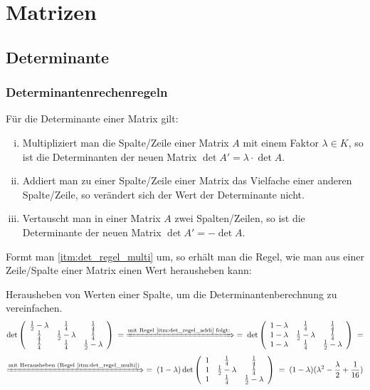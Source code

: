 \section{Matrizen}
\subsection{Determinante}
\subsubsection{Determinantenrechenregeln}\label{sec:det_regeln}
\begin{satz}Für die Determinante einer Matrix gilt:
\begin{enumerate}[i)]
    \item \label{itm:det_regel_multi} Multipliziert man die Spalte/Zeile einer Matrix $A$ mit einem Faktor $\lambda\in K$, so ist die Determinanten der neuen Matrix $\det A'=\lambda\cdot \det A$.
    \item \label{itm:det_regel_addi}Addiert man zu einer Spalte/Zeile einer Matrix das Vielfache einer anderen Spalte/Zeile, so verändert sich der Wert der Determinante nicht.
    \item Vertauscht man in einer Matrix $A$ zwei Spalten/Zeilen, so ist die Determinante der neuen Matrix $\det A'=-\det A$.
\end{enumerate}
\end{satz}
Formt man \ref{itm:det_regel_multi} um, so erhält man die Regel, wie man aus einer Zeile/Spalte einer Matrix einen Wert herausheben kann:
\begin{bsp} Herausheben von Werten einer Spalte, um die Determinantenberechnung zu vereinfachen.
\[
\det\left(\begin{array}{ccc}
\frac{1}{2}-\lambda & \frac{1}{4} & \frac{1}{4}\\
\frac{1}{4} & \frac{1}{2}-\lambda & \frac{1}{4}\\
\frac{1}{4} & \frac{1}{4} & \frac{1}{2}-\lambda\\
\end{array}\right)\;=\;
\xRightarrow{\text{mit Regel \ref{itm:det_regel_addi} folgt:}}
\;=\;
\det\left(\begin{array}{ccc}
1-\lambda & \frac{1}{4} & \frac{1}{4}\\
1-\lambda & \frac{1}{2}-\lambda & \frac{1}{4}\\
1-\lambda & \frac{1}{4} & \frac{1}{2}-\lambda\\
\end{array}\right)\;=
\]
\[
\xRightarrow{\text{mit Herausheben (Regel \ref{itm:det_regel_multi})}}
\;=\;(1-\lambda)
\det\left(\begin{array}{ccc}
1 & \frac{1}{4} & \frac{1}{4}\\
1 & \frac{1}{2}-\lambda & \frac{1}{4}\\
1 & \frac{1}{4} & \frac{1}{2}-\lambda\\
\end{array}\right)\;=\;(1-\lambda)(\lambda^2-\frac{\lambda}{2}+\frac{1}{16}) 
\]

\end{bsp}
